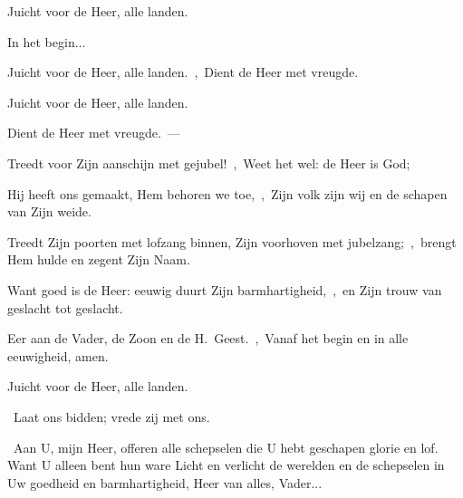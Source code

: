 \documentclass[12pt,twoside,a5paper]{article}
\begin{document}
\begin{halfparskip}
   Juicht voor de Heer, alle landen.

  \begin{exceptionalexception}
      In het begin...

    Juicht voor de Heer, alle landen.~\sep\ Dient de Heer met vreugde.
  \end{exceptionalexception}

   

  Juicht voor de Heer, alle landen.

  Dient de Heer met vreugde.~--- 

   Treedt voor Zijn aanschijn met gejubel!~\sep\ Weet het wel: de Heer is God;

  Hij heeft ons gemaakt, Hem behoren we toe,~\sep\ Zijn volk zijn wij en de schapen van Zijn weide.

  Treedt Zijn poorten met lofzang binnen, Zijn voorhoven met jubelzang;~\sep\ brengt Hem hulde en zegent Zijn Naam.

  Want goed is de Heer: eeuwig duurt Zijn barmhartigheid,~\sep\ en Zijn trouw van geslacht tot geslacht.

  Eer aan de Vader, de Zoon en de H.~Geest.~\sep\ Vanaf het begin en in alle eeuwigheid, amen.

  Juicht voor de Heer, alle landen.

   
\end{halfparskip}

\begin{halfparskip}
  \dd~Laat ons bidden; vrede zij met ons.

  \cc~Aan U, mijn Heer, offeren alle schepselen die U hebt geschapen glorie en lof. Want U alleen bent hun ware Licht en verlicht de werelden en de schepselen in Uw goedheid en barmhartigheid, Heer van alles, Vader...
\end{halfparskip}
\end{document}

